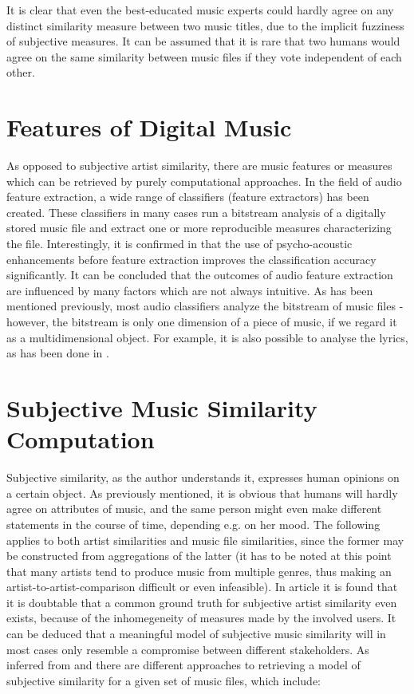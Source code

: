 It is clear that even the best-educated music experts could hardly agree on 
any distinct similarity measure between two music titles, due to the implicit fuzziness of subjective measures.
It can be assumed that it is rare that two humans would agree on the same similarity between music files
if they vote independent of each other.

\section{Features of Digital Music}

As opposed to subjective artist similarity, there are music features or measures which can be retrieved by
purely computational approaches. In the field of audio feature extraction, a wide range of classifiers
(feature extractors) has been created. These classifiers in many cases run a bitstream analysis of a digitally
stored music file and extract one or more reproducible measures characterizing the file. 
Interestingly, it is confirmed in \cite{LID_05ismir} that the use of psycho-acoustic enhancements before
feature extraction improves the classification accuracy significantly. It can be concluded that the outcomes of
audio feature extraction are influenced by many factors which are not always intuitive.
As has been mentioned previously, most audio classifiers analyze the bitstream of music files - however,
the bitstream is only one dimension of a piece of music, if we regard it as a multidimensional object. For example,
it is also possible to analyse the lyrics, as has been done in \cite{DBLP:conf/ismir/MayerNR08}.

\section{Subjective Music Similarity Computation}

Subjective similarity, as the author understands it, expresses human opinions on a certain object. As previously
mentioned, it is obvious that humans will hardly agree on attributes of music, and the same person might even make
different statements in the course of time, depending e.g. on her mood. The following applies to both artist 
similarities and music file similarities, since the former may be constructed from aggregations of the latter 
(it has to be noted at this point that many artists tend to produce music from multiple genres, thus making
an artist-to-artist-comparison difficult or even infeasible).
In article \cite{Ellis02thequest} it is found that it is doubtable that a common ground truth for subjective
artist similarity even exists, because of the inhomegeneity of measures made by the involved users. It can be
deduced that a meaningful model of subjective music similarity will in most cases only resemble a compromise
between different stakeholders.
As inferred from \cite{Berenzweig03alarge-scale} and \cite{mcfee09_hesas} there are different approaches to 
retrieving a model of subjective similarity for a given set of music files, which include:

